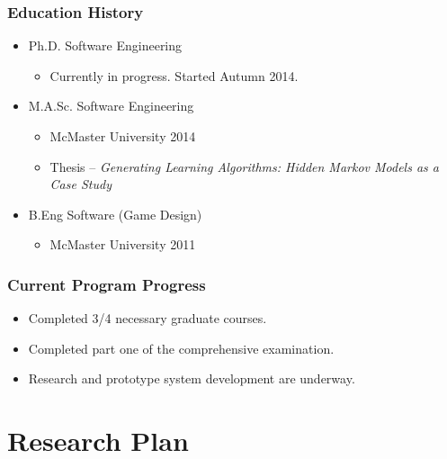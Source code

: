 \documentclass{beamer}
\begin{document}
\begin{frame}

\frametitle{Education History}

\begin{itemize}
\item Ph.D. Software Engineering
	\begin{itemize}
	\item Currently in progress. Started Autumn 2014.
	\end{itemize}
\item M.A.Sc. Software Engineering
	\begin{itemize}
	\item McMaster University 2014
	\item Thesis -- \textit{Generating Learning Algorithms: Hidden Markov Models as a Case Study}
	\end{itemize}
\item B.Eng Software (Game Design) 
\begin{itemize}
	\item McMaster University 2011
	\end{itemize}

\end{itemize}
\end{frame}



\begin{frame}
\frametitle{Current Program Progress}
\begin{itemize}
\item Completed 3/4 necessary graduate courses.
\item Completed part one of the comprehensive examination.
\item Research and prototype system development are underway.
\end{itemize}
\end{frame}


\section[Research]{Research Plan}
\end{document}
